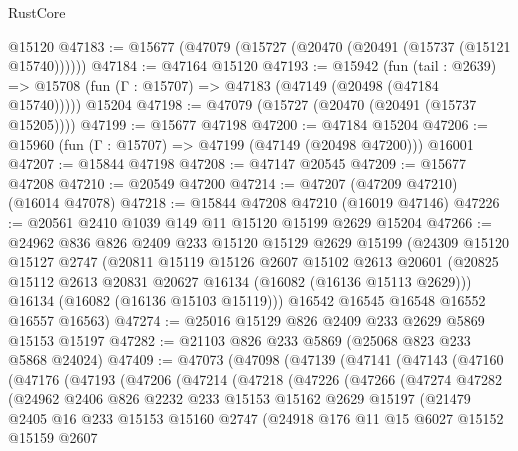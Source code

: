 \begin{lexlean}{RustCore}
\begin{coremodule}
    @15120
@47183 := @15677 (@47079 (@15727 (@20470 (@20491 (@15737 (@15121 @15740))))))
@47184 := @47164 @15120
@47193 := @15942
    (fun (tail : @2639) => @15708 (fun (Γ : @15707) => @47183 (@47149 (@20498 (@47184 @15740)))))
    @15204
@47198 := @47079 (@15727 (@20470 (@20491 (@15737 @15205))))
@47199 := @15677 @47198
@47200 := @47184 @15204
@47206 := @15960 (fun (Γ : @15707) => @47199 (@47149 (@20498 @47200))) @16001
@47207 := @15844 @47198
@47208 := @47147 @20545
@47209 := @15677 @47208
@47210 := @20549 @47200
@47214 := @47207 (@47209 @47210) (@16014 @47078)
@47218 := @15844 @47208 @47210 (@16019 @47146)
@47226 := @20561 @2410 @1039 @149 @11 @15120 @15199 @2629 @15204
@47266 := @24962
    @836
    @826
    @2409
    @233
    @15120
    @15129
    @2629
    @15199
    (@24309
      @15120
      @15127
      @2747
      (@20811
        @15119
        @15126
        @2607
        @15102
        @2613
        @20601
        (@20825 @15112 @2613 @20831 @20627 @16134 (@16082 (@16136 @15113 @2629)))
        @16134
        (@16082 (@16136 @15103 @15119)))
      @16542
      @16545
      @16548
      @16552
      @16557
      @16563)
@47274 := @25016 @15129 @826 @2409 @233 @2629 @5869 @15153 @15197
@47282 := @21103 @826 @233 @5869 (@25068 @823 @233 @5868 @24024)
@47409 := @47073
    (@47098
      (@47139
        (@47141
          (@47143
            (@47160
              (@47176
                (@47193
                  (@47206
                    (@47214
                      (@47218
                        (@47226
                          (@47266
                            (@47274
                              @47282
                              (@24962
                                @2406
                                @826
                                @2232
                                @233
                                @15153
                                @15162
                                @2629
                                @15197
                                (@21479
                                  @2405
                                  @16
                                  @233
                                  @15153
                                  @15160
                                  @2747
                                  (@24918
                                    @176
                                    @11
                                    @15
                                    @6027
                                    @15152
                                    @15159
                                    @2607

\end{coremodule}
\end{lexlean}
